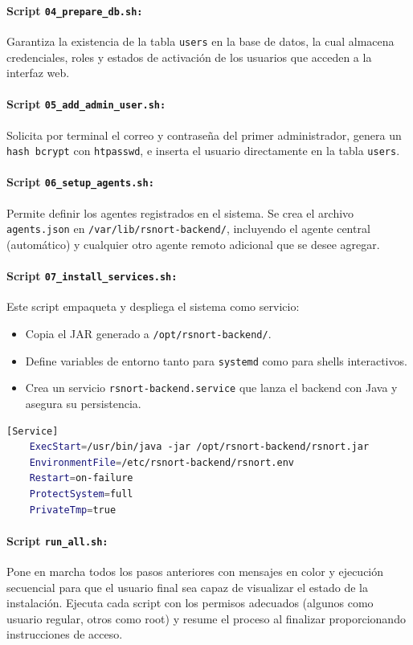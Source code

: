 \documentclass[11pt,a4paper,twoside]{report}
\begin{document}
\paragraph{Script \texttt{04\_prepare\_db.sh:}} Garantiza la existencia de la tabla \texttt{users} en la base de datos, la cual almacena credenciales, roles y estados de activación de los usuarios que acceden a la interfaz web.

\paragraph{Script \texttt{05\_add\_admin\_user.sh:}} Solicita por terminal el correo y contraseña del primer administrador, genera un \texttt{hash bcrypt} con \texttt{htpasswd}, e inserta el usuario directamente en la tabla \texttt{users}.

\paragraph{Script \texttt{06\_setup\_agents.sh:}} Permite definir los agentes registrados en el sistema. Se crea el archivo \texttt{agents.json} en \texttt{/var/lib/rsnort-backend/}, incluyendo el agente central (automático) y cualquier otro agente remoto adicional que se desee agregar.

\paragraph{Script \texttt{07\_install\_services.sh:}} Este script empaqueta y despliega el sistema como servicio:
\begin{itemize}
	\item Copia el JAR generado a \texttt{/opt/rsnort-backend/}.
	\item Define variables de entorno tanto para \texttt{systemd} como para shells interactivos.
	\item Crea un servicio \texttt{rsnort-backend.service} que lanza el backend con Java y asegura su persistencia.
\end{itemize}

\begin{lstlisting}[language=bash, caption={Fragmento del servicio systemd para el backend}]
	[Service]
	ExecStart=/usr/bin/java -jar /opt/rsnort-backend/rsnort.jar
	EnvironmentFile=/etc/rsnort-backend/rsnort.env
	Restart=on-failure
	ProtectSystem=full
	PrivateTmp=true
\end{lstlisting}

\paragraph{Script \texttt{run\_all.sh:}} Pone en marcha todos los pasos anteriores con mensajes en color y ejecución secuencial para que el usuario final sea capaz de visualizar el estado de la instalación. Ejecuta cada script con los permisos adecuados (algunos como usuario regular, otros como root) y resume el proceso al finalizar proporcionando instrucciones de acceso.
\end{document}
